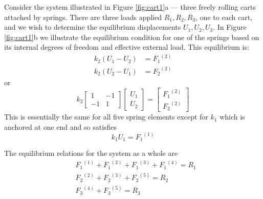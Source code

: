 \documentclass[10pt]{article}
\begin{document}
	Consider the system illustrated in Figure \ref{fig:cart1}a --- three freely rolling carts
	attached by springs. There are three loads applied $R_1,R_2,R_3$, one to each cart, and we wish 
	to determine the equilibrium displacements $U_1,U_2,U_3$.  In Figure \ref{fig:cart1}b we
	illustrate the equilibrium condition for one of the springs based on its internal degrees
	of freedom and effective external load. This equilibrium is:
			\begin{equation}
					\begin{split}
							k_2 (U_1 - U_2) &= {F_1}^{(2)} \\
							k_2 (U_2 - U_1) &= {F_2}^{(2)}
					\end{split}
			\end{equation}
	or
			\begin{equation}
					k_2	\left[  \begin{array}{cc}  1 & -1 \\ -1 & 1 \end{array} \right]
							\left[		\begin{array}{c} U_1 \\ U_2 \end{array} \right] = 
							\left[		\begin{array}{c} {F_1}^{(2)} \\ {F_2}^{(2)}\end{array} \right] 
			\end{equation}
	 This is essentially the same for all five spring elements
	 except for $k_1$ which is anchored at one end and
	 so satisfies
	 	\begin{equation}
	 		k_1 U_1 = {F_1}^{(1)}
	 	\end{equation}
		 
	 The equilibrium relations for the system as a whole are 
	 		\begin{equation}
					\begin{split}
						& {F_1}^{(1)} + 			{F_1}^{(2)} + 			{F_1}^{(3)} + 			{F_1}^{(4)} = R_1 \\
						& {F_2}^{(2)} + 			{F_2}^{(3)} + 			{F_2}^{(5)} = R_2 \\
						& {F_3}^{(4)} + 			{F_3}^{(5)} = R_3
					\end{split}
					\label{eq:globeq}
			\end{equation}
		
\end{document}
